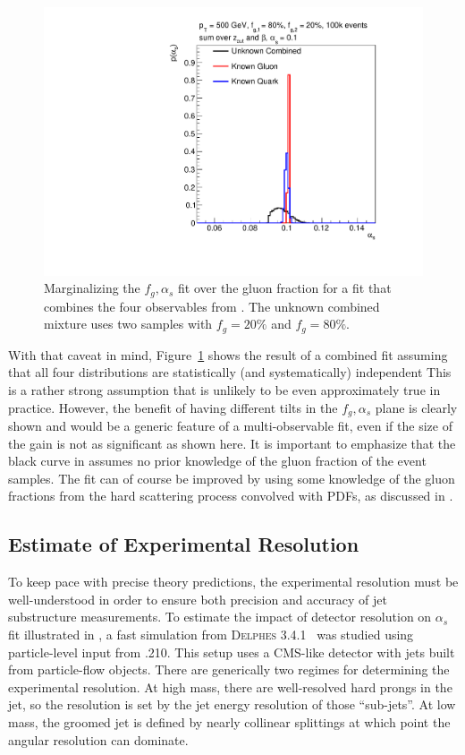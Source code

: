 \begin{figure}[t]
\begin{center}
\includegraphics[width = 0.49\columnwidth]{figures/combination23451324.pdf}
\end{center}
\caption{Marginalizing the $f_g,\alpha_s$ fit over the gluon fraction for a fit that combines the four observables from .  The unknown combined mixture uses two samples with $f_g=20\%$ and $f_g=80\%$.}
\label{fig:combo}
\end{figure}

With that caveat in mind, Figure~\ref{fig:combo} shows the result of a combined fit assuming that all four distributions are statistically (and systematically) independent
%
This is a rather strong assumption that is unlikely to be even approximately true in practice.
%
However, the benefit of having different tilts in the $f_g,\alpha_s$ plane is clearly shown and would be a generic feature of a multi-observable fit, even if the size of the gain is not as significant as shown here.
%
It is important to emphasize that the black curve in  assumes no prior knowledge of the gluon fraction of the event samples.
%
The fit can of course be improved by using some knowledge of the gluon fractions from the hard scattering process convolved with PDFs, as discussed in .


\subsection{Estimate of Experimental Resolution}
\label{sec:resolution}

To keep pace with precise theory predictions, the experimental resolution must be well-understood in order to ensure both precision and accuracy of jet substructure measurements.
%
To estimate the impact of detector resolution on $\alpha_s$ fit illustrated in , a fast simulation from \textsc{Delphes} 3.4.1~\cite{deFavereau:2013fsa} was studied using particle-level input from \pythia.210.
%
This setup uses a CMS-like detector with jets built from particle-flow objects.
%
There are generically two regimes for determining the experimental resolution.
%
At high mass, there are well-resolved hard prongs in the jet, so the resolution is set by the jet energy resolution of those ``sub-jets''.
%
At low mass, the groomed jet is defined by nearly collinear splittings at which point the angular resolution can dominate.


